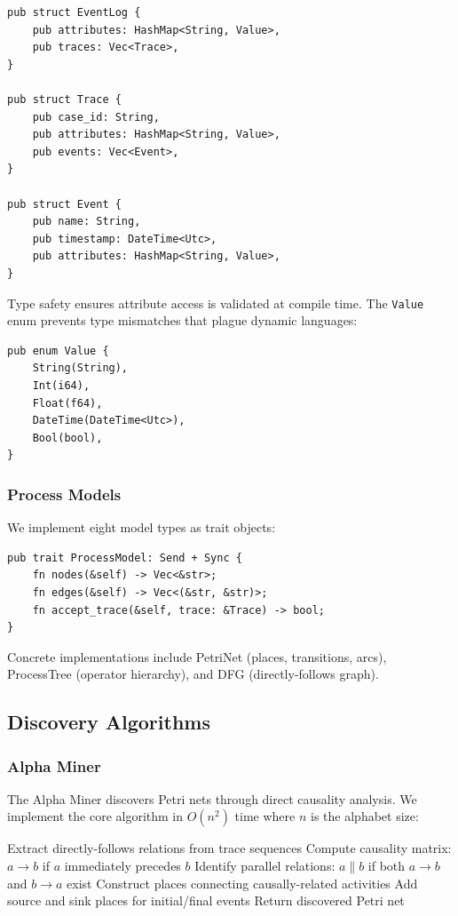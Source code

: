 \documentclass[11pt,twocolumn]{article}
\begin{document}
\begin{lstlisting}
pub struct EventLog {
    pub attributes: HashMap<String, Value>,
    pub traces: Vec<Trace>,
}

pub struct Trace {
    pub case_id: String,
    pub attributes: HashMap<String, Value>,
    pub events: Vec<Event>,
}

pub struct Event {
    pub name: String,
    pub timestamp: DateTime<Utc>,
    pub attributes: HashMap<String, Value>,
}
\end{lstlisting}

Type safety ensures attribute access is validated at compile time. The \texttt{Value} enum prevents type mismatches that plague dynamic languages:

\begin{lstlisting}
pub enum Value {
    String(String),
    Int(i64),
    Float(f64),
    DateTime(DateTime<Utc>),
    Bool(bool),
}
\end{lstlisting}

\subsubsection{Process Models}
We implement eight model types as trait objects:

\begin{lstlisting}
pub trait ProcessModel: Send + Sync {
    fn nodes(&self) -> Vec<&str>;
    fn edges(&self) -> Vec<(&str, &str)>;
    fn accept_trace(&self, trace: &Trace) -> bool;
}
\end{lstlisting}

Concrete implementations include PetriNet (places, transitions, arcs), ProcessTree (operator hierarchy), and DFG (directly-follows graph).

\subsection{Discovery Algorithms}

\subsubsection{Alpha Miner}
The Alpha Miner discovers Petri nets through direct causality analysis. We implement the core algorithm in $O(n^2)$ time where $n$ is the alphabet size:

\begin{algorithm}
\caption{Alpha Miner Discovery}
\begin{algorithmic}
\State Extract directly-follows relations from trace sequences
\State Compute causality matrix: $a \to b$ if $a$ immediately precedes $b$
\State Identify parallel relations: $a \parallel b$ if both $a \to b$ and $b \to a$ exist
\State Construct places connecting causally-related activities
\State Add source and sink places for initial/final events
\State Return discovered Petri net
\end{algorithmic}
\end{algorithm}
\end{document}
